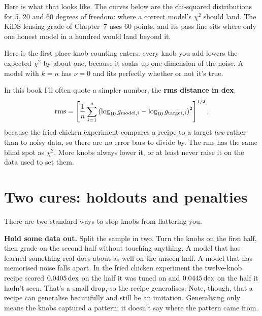 Here is what that looks like. The curves below are the chi-squared distributions for 5, 20 and 60 degrees of freedom: where a correct model's $\chi^2$ should land. The KiDS lensing grade of Chapter~7 uses 60 points, and its pass line sits where only one honest model in a hundred would land beyond it.



 Here is the first place knob-counting enters: every knob you add lowers the expected $\chi^2$ by about one, because it soaks up one dimension of the noise. A model with $k=n$ has $\nu=0$ and fits perfectly whether or not it's true.

In this book I'll often quote a simpler number, the \textbf{rms distance in dex},
\begin{equation}
\mathrm{rms}=\left[\frac1n\sum_{i=1}^{n}\left(\log_{10}g_{{\rm model},i}-\log_{10}g_{{\rm target},i}\right)^2\right]^{1/2},
\end{equation}
because the fried chicken experiment compares a recipe to a target \emph{law} rather than to noisy data, so there are no error bars to divide by. The rms has the same blind spot as $\chi^2$. More knobs always lower it, or at least never raise it on the data used to set them.

\section{Two cures: holdouts and penalties}

There are two standard ways to stop knobs from flattering you.

\textbf{Hold some data out.} Split the sample in two. Turn the knobs on the first half, then grade on the second half without touching anything. A model that has learned something real does about as well on the unseen half. A model that has memorised noise falls apart. In the fried chicken experiment the twelve-knob recipe scored $0.0405\,\mathrm{dex}$ on the half it was tuned on and $0.0445\,\mathrm{dex}$ on the half it hadn't seen. That's a small drop, so the recipe generalises. Note, though, that a recipe can generalise beautifully and still be an imitation. Generalising only means the knobs captured a pattern; it doesn't say where the pattern came from.



